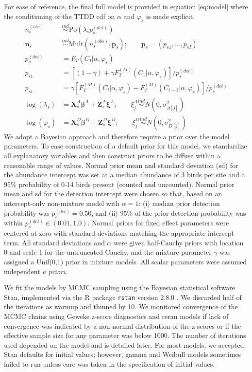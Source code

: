 \documentclass[12pt]{article}
\newcommand{\vn}{\textbf{n}}
\newcommand{\vp}{\textbf{p}}
\newcommand{\vX}{\textbf{X}}
\newcommand{\vZ}{\textbf{Z}}
\newcommand{\vbeta}{\boldsymbol{\beta}}
\newcommand{\vxi}{\boldsymbol{\xi}}
\newcommand{\Po}{\mbox{Po}}
\newcommand{\Mult}{\mbox{Mult}}
\newcommand{\pdet}{p^{(det)}}
\newcommand{\ind}{\stackrel{ind}{\sim}}
\newcommand{\Fm}{F_T^{(M)}}
\newcommand{\nobs}{n^{(obs)}}
\begin{document}
For ease of reference, the final full model is provided in equation \eqref{eq:model} where the conditioning of the TTDD cdf on $\alpha$ and $\varphi_s$ is made explicit.
\begin{align}
\nobs_s &\ind \Po(\lambda_s \pdet_s) \nonumber\\
\vn_s &\ind \Mult(\nobs_s, \vp_s); \qquad \vp_s = (p_{s1},\dots,p_{sI}) \nonumber\\
\pdet_s &= F_T(C_I|\alpha,\varphi_s) \nonumber \\
p_{s1} &= \left[(1-\gamma) + \gamma\Fm(C_1|\alpha,\varphi_s)\right]/\pdet_s \label{eq:model} \\
p_{si} &= \gamma\left[\Fm(C_i|\alpha,\varphi_s) - \Fm(C_{i-1}|\alpha,\varphi_s)\right]/\pdet_s \nonumber\\
\log(\lambda_s) &= \vX_{s}^A\vbeta^A + \vZ_{s}^A\vxi^A; \qquad \xi_j^A \ind N(0,\sigma_{A[j]}^2) \nonumber\\
\log(\varphi_{s}) &= \vX_{s}^D\vbeta^D + \vZ_{s}^D\vxi^D; \qquad \xi_j^D \ind N(0,\sigma_{D[j]}^2) \nonumber
\end{align}
We adopt a Bayesian approach and therefore require a prior over the model parameters.
To ease construction of a default prior for this model, we standardize all explanatory variables and then construct priors to be diffuse within a reasonable range of values.
Normal prior mean and standard deviation (sd) for the abundance intercept was set at a median abundance of 3 birds per site and a 95\% probability of 0-14 birds present (counted and uncounted).  
Normal prior mean and sd for the detection intercept were chosen so that, based on an intercept-only non-mixture model with $\alpha=1$: (i) median prior detection probability was $p_{s}^{(det)} = 0.50$, and (ii) 95\% of the prior detection probability was within $p_{s}^{(det)} \in (0.01, 1.0)$.  
Normal priors for fixed effect parameters were centered at zero with standard deviations matching the appropriate intercept term.  
All standard deviations and $\alpha$ were given half-Cauchy priors with location 0 and scale 1 for the untruncated Cauchy, and the mixture parameter $\gamma$ was assigned a Unif(0,1) prior in mixture models.
All scalar parameters were assumed independent \emph{a priori}. 



We fit the models by MCMC sampling using the Bayesian statistical software Stan, implemented via the R package \texttt{rstan} version 2.8.0 \citep{Rstan2016}.  
We discarded half of the iterations as warmup and thinned by 10.  
We monitored convergence of the MCMC chains using Geweke z-score diagnostics \citep{Geweke1991} and reran models if lack of convergence was indicated by a non-normal distribution of the z-scores or if the effective sample size for any parameter was below 1000.  
The number of iterations used depended on the model and is detailed later. 
For most models, we accepted Stan defaults for initial values; however, gamma and Weibull models sometimes failed to run unless care was taken in the specification of initial values.
\end{document}
